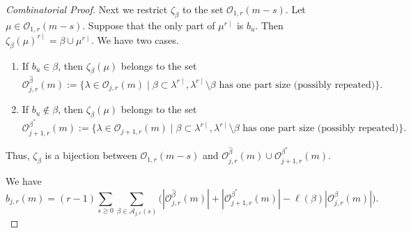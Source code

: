 \documentclass[reqno,12pt]{amsart}
\theoremstyle{definition}
\begin{document}
\begin{proof}[Combinatorial Proof]
Next we restrict $\zeta_\beta$ to the set $\mathcal O_{1,r}(m-s)$. Let $\mu\in \mathcal O_{1,r}(m-s)$. Suppose that the only part of $\mu^{r\mid}$ is $b_u$.  Then $\zeta_\beta(\mu)^{r\mid}=\beta\cup \mu^{r\mid}.$ We have two cases. 

\begin{enumerate}

\item[i)] If $b_u\in \beta$, then $\zeta_\beta(\mu)$ belongs to the set
$$\mathcal O^{\hat\beta}_{j,r}(m):=\{\lambda \in \mathcal O_{j,r}(m)\mid \beta \subset \lambda^{r\mid},  \lambda^{r\mid}\setminus\beta \text{ has one part size (possibly repeated)}\}.$$ 


\item[ii)] If $b_u\not\in \beta$, then $\zeta_\beta(\mu)$ belongs to the set 
$$\mathcal O^{\beta^*}_{j+1,r}(m):=\{\lambda \in \mathcal O_{j+1,r}(m)\mid \beta \subset \lambda^{r\mid},  \lambda^{r\mid}\setminus\beta \text{ has one part size (possibly repeated)}\}.$$


\end{enumerate}

Thus, $\zeta_\beta$ is a bijection between $\mathcal O_{1,r}(m-s)$ and $\mathcal O^{\hat\beta}_{j,r}(m)\cup \mathcal O^{\beta^*}_{j+1,r}(m)$.

We have 
\begin{equation}\label{bjr1}
b_{j,r}(m) = (r-1)\sum_{s\geq 0}\sum_{\beta\in \mathcal A_{j,r}(s)}\Big(|\mathcal O^{\hat\beta}_{j,r}(m)|+|\mathcal O^{\beta^*}_{j+1,r}(m) |-\ell(\beta)|\mathcal O^{\beta}_{j,r}(m)|\Big).
\end{equation}


\end{proof}
\end{document}
